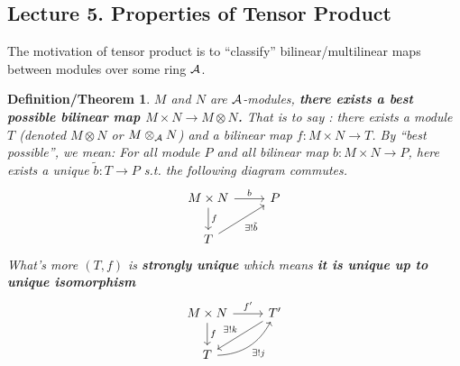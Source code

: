 \documentclass[11pt]{article}
\newtheorem{dfn/thm}[thm]{Definition/Theorem}
\newcommand{\cala}{{\cal A}}
\newcommand{\rta}{\rightarrow}
\newcommand{\lrta}{\longrightarrow}
\begin{document}
\subsection{Lecture 5. Properties of Tensor Product}
The motivation of tensor product is  to ``classify'' bilinear/multilinear maps between modules over some ring $\cala$.
\begin{dfn/thm}
$M$ and $N$ are $\cala$-modules, \textbf{there exists a best possible bilinear map $M\times N\rta M\otimes N$.} That is to say : there exists a module $T$ (denoted $M\otimes N$ or $M\otimes_\cala N$) and a bilinear map $f:M\times N\lrta T$. By ``best possible'', we mean:
For all module $P$ and all bilinear map $b:M\times N\rta P$,
here exists a unique $\tilde{b}:T\lrta P$ s.t. the following  diagram commutes.
\[
\begin{tikzcd}
 M\times N \arrow[d,"f"] \ar[r,"b"] & P \\
T\arrow[swap,ur,"\exists !\tilde{b}"] &    
\end{tikzcd}
\] 
What's more $(T,f)$ is \textbf{strongly unique} which means \textbf{it is unique up to unique isomorphism}
\[
\begin{tikzcd}
 M\times N \arrow[d,"f"] \ar[r,"f'"] & T'\arrow[swap,dl,"\exists !k"] \\
T\arrow[swap,ur,bend right,"\exists !j"] &    
\end{tikzcd}
\] 
\end{dfn/thm}
\end{document}
